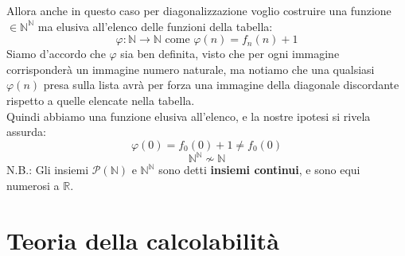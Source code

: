 \documentclass{article}
\begin{document}
Allora anche in questo caso per diagonalizzazione voglio costruire una funzione $\in\mathbb{N}^{\mathbb{N}}$ ma
elusiva all'elenco delle funzioni della tabella:
$$\varphi:\mathbb{N}\rightarrow\mathbb{N}\text{ come }\varphi(n)=f_n(n)+1$$
Siamo d'accordo che $\varphi$ sia ben definita, visto che per ogni immagine corrisponderà un immagine numero naturale,
ma notiamo che una qualsiasi $\varphi(n)$ presa sulla lista avrà per forza una immagine della diagonale discordante
rispetto a quelle elencate nella tabella.\\ Quindi abbiamo una funzione elusiva all'elenco, e la nostre ipotesi si rivela assurda:
$$\varphi(0)=f_0(0)+1\neq f_0(0)$$
$$\mathbb{N}^{\mathbb{N}}\nsim\mathbb{N}$$
N.B.: Gli insiemi $\mathcal{P}(\mathbb{N})$ e $\mathbb{N}^{\mathbb{N}}$ sono detti \textbf{insiemi continui},
e sono equi numerosi a $\mathbb{R}$.

\section{Teoria della calcolabilità}
\end{document}
